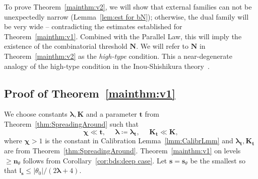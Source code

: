 \documentclass{amsart}
\renewcommand{\sp}{{\ \ }}
\newcommand{\1}{{\mathbb 1 }}
\newcommand{\blambda}{{\boldsymbol\lambda}}
\newcommand{\bN}{{\mathbf N}}
\newcommand{\bK}{{\mathbf K}}
\newcommand{\bbn}{{\mathbf n}}
\newcommand{\bbs}{{\mathbf s}}
\newcommand{\bbt}{{\mathbf t}}
\newcommand{\length}{{\mathfrak l}}
\theoremstyle{remark}
\numberwithin{equation}{section}
\theoremstyle{definition}
\newcommand{\bchi}{{\boldsymbol{ \chi}}}
\begin{document}
To prove Theorem~\ref{mainthm:v2}, we will show that external families can not be unexpectedly narrow (Lemma~\ref{lem:est for bN}); otherwise, the dual family will be very wide -- contradicting the estimates established for Theorem~\ref{mainthm:v1}. Combined with the Parallel Law, this will imply the existence of the combinatorial threshold $\bN$. We will refer to $\bN$ in Theorem~\ref{mainthm:v2} as the \emph{high-type} condition. This a near-degenerate analogy of the high-type condition in the Inou-Shishikura theory~\cite{IS}.



\subsection{Proof of Theorem~\ref{mainthm:v1}}
We choose constants $\blambda, \bK$ and a parameter $\bbt$ from Theorem~\ref{thm:SpreadingAround} such that
\[ \bchi\ll  \bbt,\sp\sp\sp  \blambda\coloneqq \blambda_\bbt, \sp\sp \sp \bK_\bbt\ll \bK,\]
where $\bchi>1$ is the constant in Calibration Lemma~\ref{lmm:CalibrLmm} and $\blambda_\bbt,\bK_\bbt$ are from Theorem~\ref{thm:SpreadingAround}. Theorem~\ref{mainthm:v1} on levels $\ge \bbn_\theta$ follows from Corollary~\ref{cor:bds:deep case}. Let $\bbs=\bbs_\theta$ be the smallest so that $\length_\bbs\le |\theta_0|/(2\blambda+4)$. %
\end{document}
